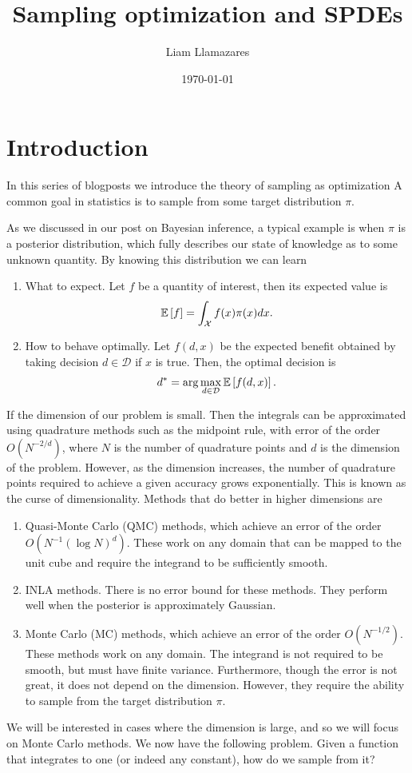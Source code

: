 \documentclass[
    a4paper,
    DIV=14,
    abstract=true,
    numbers=noenddot
]
{scrartcl}
\theoremstyle{definition}
\newcommand{\E}{\mathbb{E}}
\newcommand{\Dd}{\mathcal{D}}
\newcommand{\Xx}{\mathcal{X}}
\begin{document}
\title{Sampling optimization and SPDEs}
\author{Liam Llamazares}
\date{\today}
\maketitle

\section{Introduction}
In this series of blogposts we introduce the theory of sampling as optimization 
A common goal in statistics is to sample from some target distribution $\pi$. 

As we discussed in our post on Bayesian inference, a typical example is when $\pi $ is a posterior distribution, which fully describes our state of knowledge as to some unknown quantity. By knowing this distribution we can learn 
\begin{enumerate}
    \item What to expect. Let $f$ be a quantity of interest, then its expected value is 
    \begin{align}\label{target integral}
         \E\qb{f}= \int_\Xx  f(x) \pi(x) dx. 
    \end{align}
     \item How to behave optimally. Let $f(d, x )$ be the expected benefit obtained by taking decision $d \in \Dd $ if $x$ is true. Then, the optimal decision is
     \begin{align*}
         d^* = \arg\max_{d \in \Dd} \E\qb{f(d, x)}.
     \end{align*}
\end{enumerate}
If the dimension of our problem is small. Then the integrals can be approximated using quadrature methods such as the midpoint rule, with error of the order $O(N^{-2/d})$, where $N$ is the number of quadrature points and $d$ is the dimension of the problem. However, as the dimension increases, the number of quadrature points required to achieve a given accuracy grows exponentially. This is known as the curse of dimensionality. Methods that do better in higher dimensions are
\begin{enumerate}
    \item Quasi-Monte Carlo (QMC) methods, which achieve an error of the order $O(N^{-1}(\log N)^d)$. These work on any domain that can be mapped to the unit cube and require the integrand to be sufficiently smooth.
    \item INLA methods. There is no error bound for these methods. They perform well when the posterior is approximately Gaussian.
    \item Monte Carlo (MC) methods, which achieve an error of the order $O(N^{-1/2})$. These methods work on any domain. The integrand is not required to be smooth, but must have finite variance. Furthermore, though the error is not great, it does not depend on the dimension. However, they require the ability to sample from the target distribution $\pi$.
\end{enumerate}
We will be interested in cases where the dimension is large, and so we will focus on Monte Carlo methods. We now have the following problem. Given a function that integrates to one (or indeed any constant), how do we sample from it?
\end{document}
